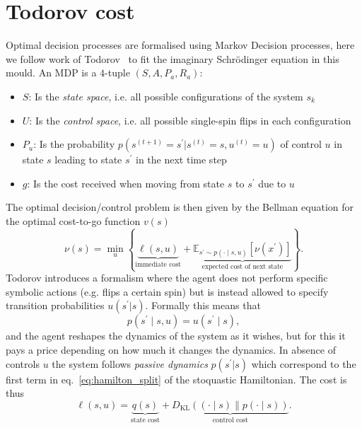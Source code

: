 \section{Todorov cost}
\label{app:todorov-cost}
Optimal decision processes are formalised using Markov Decision processes, here we follow work of Todorov~\cite{todorov2007linearly, todorov2009efficient} to fit the imaginary Schr\" odinger equation in this mould. An MDP is a $4$-tuple $\left(S, A, P_{a}, R_{a}\right)$:
\begin{itemize}
	\item $S$: Is the \emph{state space}, i.e. all possible configurations of the system $s_k$
	\item $U$: Is the \emph{control space}, i.e. all possible single-spin flips in each configuration
	\item $P_u$: Is the probability  $p(s^{(t+1)} = s^\prime | s^{(t)} = s, u^{(t)} = u)$ of control $u$ in state $s$ leading to state $s^\prime$ in the next time step
	\item $g$: Is the cost received when moving from state $s$ to $s^\prime$ due to $u$
\end{itemize}
The optimal decision/control problem is then given by the Bellman equation for the optimal cost-to-go function $v(s)$
\begin{equation}
	\nu(s)=\min _{u}\left\{
	\underbrace{\ell(s, u)}_{\text{immediate cost}}
	+
	\underbrace{\mathbb{E}_{s^{\prime} \sim p(\cdot \mid s, u)}\left[\nu\left(x^{\prime}\right)\right]}_{\text{expected cost of next state}}
	\right\}.
\end{equation}
Todorov introduces a formalism where the agent does not perform specific symbolic actions (e.g. flips a certain spin) but is instead allowed to specify transition probabilities $u(s^\prime|s)$. Formally this means that
\begin{equation}
	p\left(s^{\prime} \mid s, u\right)=u\left(s^{\prime} \mid s\right),
\end{equation}
and the agent reshapes the dynamics of the system as it wishes, but for this it pays a price depending on how much it changes the dynamics. In absence of controls $u$ the system follows \emph{passive dynamics} $p(s^\prime | s)$ which correspond to the first term in eq.~\eqref{eq:hamilton_split} of the stoquastic Hamiltonian. The cost is thus
\begin{equation}
	\ell(s, u)=\underbrace{q(s)}_{\text{state cost}}+\underbrace{D_\mathrm{KL}((\cdot \mid s) \| p(\cdot \mid s))}_{\text{control cost}}.
\end{equation}

